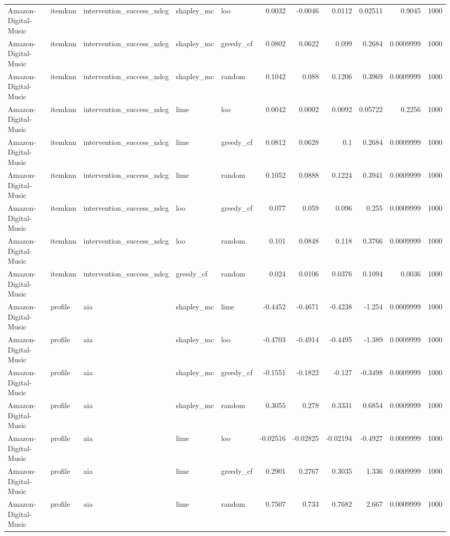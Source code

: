 \begin{table}[t]
\begin{tabular}{lllllrrrrrr}
Amazon-Digital-Music & itemknn & intervention\_success\_ndcg & shapley\_mc & loo & 0.0032 & -0.0046 & 0.0112 & 0.02511 & 0.9045 & 1000 \\
Amazon-Digital-Music & itemknn & intervention\_success\_ndcg & shapley\_mc & greedy\_cf & 0.0802 & 0.0622 & 0.099 & 0.2684 & 0.0009999 & 1000 \\
Amazon-Digital-Music & itemknn & intervention\_success\_ndcg & shapley\_mc & random & 0.1042 & 0.088 & 0.1206 & 0.3969 & 0.0009999 & 1000 \\
Amazon-Digital-Music & itemknn & intervention\_success\_ndcg & lime & loo & 0.0042 & 0.0002 & 0.0092 & 0.05722 & 0.2256 & 1000 \\
Amazon-Digital-Music & itemknn & intervention\_success\_ndcg & lime & greedy\_cf & 0.0812 & 0.0628 & 0.1 & 0.2684 & 0.0009999 & 1000 \\
Amazon-Digital-Music & itemknn & intervention\_success\_ndcg & lime & random & 0.1052 & 0.0888 & 0.1224 & 0.3941 & 0.0009999 & 1000 \\
Amazon-Digital-Music & itemknn & intervention\_success\_ndcg & loo & greedy\_cf & 0.077 & 0.059 & 0.096 & 0.255 & 0.0009999 & 1000 \\
Amazon-Digital-Music & itemknn & intervention\_success\_ndcg & loo & random & 0.101 & 0.0848 & 0.118 & 0.3766 & 0.0009999 & 1000 \\
Amazon-Digital-Music & itemknn & intervention\_success\_ndcg & greedy\_cf & random & 0.024 & 0.0106 & 0.0376 & 0.1094 & 0.0036 & 1000 \\
Amazon-Digital-Music & profile & aia & shapley\_mc & lime & -0.4452 & -0.4671 & -0.4238 & -1.254 & 0.0009999 & 1000 \\
Amazon-Digital-Music & profile & aia & shapley\_mc & loo & -0.4703 & -0.4914 & -0.4495 & -1.389 & 0.0009999 & 1000 \\
Amazon-Digital-Music & profile & aia & shapley\_mc & greedy\_cf & -0.1551 & -0.1822 & -0.127 & -0.3498 & 0.0009999 & 1000 \\
Amazon-Digital-Music & profile & aia & shapley\_mc & random & 0.3055 & 0.278 & 0.3331 & 0.6854 & 0.0009999 & 1000 \\
Amazon-Digital-Music & profile & aia & lime & loo & -0.02516 & -0.02825 & -0.02194 & -0.4927 & 0.0009999 & 1000 \\
Amazon-Digital-Music & profile & aia & lime & greedy\_cf & 0.2901 & 0.2767 & 0.3035 & 1.336 & 0.0009999 & 1000 \\
Amazon-Digital-Music & profile & aia & lime & random & 0.7507 & 0.733 & 0.7682 & 2.667 & 0.0009999 & 1000 \\

\end{tabular}
\end{table}

